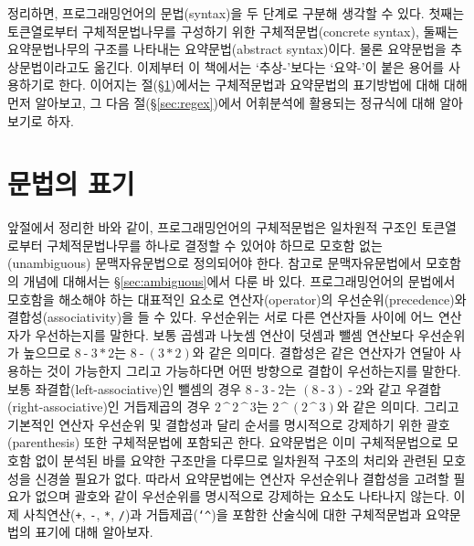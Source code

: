 정리하면, 프로그래밍언어의 문법(syntax)을 두 단계로 구분해 생각할 수 있다.
첫째는 토큰열로부터 구체적문법나무를 구성하기 위한
구체적문법(concrete syntax), 둘째는 요약문법나무의 구조를
나타내는 요약문법(abstract syntax)이다. 물론 요약문법을
추상문법이라고도 옮긴다. 이제부터 이 책에서는 `추상-'보다는 `요약-'이 붙은
용어를 사용하기로 한다. 이어지는 절(\S\ref{sec:GrammarNotation})에서는
구체적문법과 요약문법의 표기방법에 대해 대해 먼저 알아보고,
그 다음 절(\S\ref{sec:regex})에서 어휘분석에 활용되는 정규식에
대해 알아보기로 하자.

\section{문법의 표기}
\label{sec:GrammarNotation}
앞절에서 정리한 바와 같이, 프로그래밍언어의 구체적문법은 일차원적 구조인
토큰열로부터 구체적문법나무를 하나로 결정할 수 있어야 하므로 모호함 없는
(unambiguous) 문맥자유문법으로 정의되어야 한다. 참고로 문맥자유문법에서
모호함의 개념에 대해서는 \S\ref{sec:ambiguous}에서 다룬 바 있다.
프로그래밍언어의 문법에서 모호함을 해소해야 하는 대표적인 요소로
연산자(operator)의 우선순위(precedence)와 결합성(associativity)을 들 수 있다.
우선순위는 서로 다른 연산자들 사이에 어느 연산자가 우선하는지를 말한다.
보통 곱셈과 나눗셈 연산이 덧셈과 뺄셈 연산보다 우선순위가 높으므로
$8\mathop{\texttt{-}} 3\mathop{\texttt{*}}2 $는
$8\mathop{\texttt{-}}(3\mathop{\texttt{*}}2)$와 같은 의미다.
결합성은 같은 연산자가 연달아 사용하는 것이 가능한지 그리고
가능하다면 어떤 방향으로 결합이 우선하는지를 말한다.
보통 좌결합(left-associative)인 뺄셈의 경우
$ 8\mathop{\texttt{-}}3 \mathop{\texttt{-}}2$는
$(8\mathop{\texttt{-}}3)\mathop{\texttt{-}}2$와 같고
우결합(right-associative)인 거듭제곱의 경우
$2\mathop{\texttt{\char`^}} 2\mathop{\texttt{\char`^}}3 $는
$2\mathop{\texttt{\char`^}}(2\mathop{\texttt{\char`^}}3)$와 같은 의미다.
그리고 기본적인 연산자 우선순위 및 결합성과 달리 순서를 명시적으로
강제하기 위한 괄호(parenthesis) 또한 구체적문법에 포함되곤 한다.
요약문법은 이미 구체적문법으로 모호함 없이 분석된 바를 요약한 구조만을
다루므로 일차원적 구조의 처리와 관련된 모호성을 신경쓸 필요가 없다.
따라서 요약문법에는 연산자 우선순위나 결합성을 고려할 필요가 없으며
괄호와 같이 우선순위를 명시적으로 강제하는 요소도 나타나지 않는다.
이제 사칙연산(\texttt{+}, \texttt{-}, \texttt{*}, \texttt{/})과
거듭제곱(\texttt{\char`^})을 포함한 산술식에 대한 구체적문법과
요약문법의 표기에 대해 알아보자.

